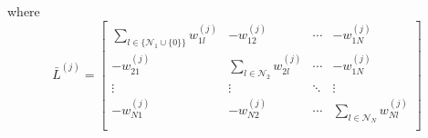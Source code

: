 \documentclass{ifacconf}
\begin{document}



where
\begin{equation*}
   \bar{L}^{(j)} = \begin{bmatrix}
           \sum_{l \in  \{\mathcal{N}_1 \cup \{ 0 \}\}} w_{1l}^{(j)} & -w_{12}^{(j)} & \cdots & -w_{1N}^{(j)} \\
            -w_{21}^{(j)} & \sum_{l \in \mathcal{N}_2}w_{2l}^{(j)} & \cdots & -w_{1N}^{(j)} \\
           \vdots & \vdots & \ddots & \vdots \\
            -w_{N1}^{(j)} & -w_{N2}^{(j)}& \cdots & \sum_{l \in \mathcal{N}_N}w_{Nl}^{(j)} \\
   \end{bmatrix}
\end{equation*}
\end{document}
